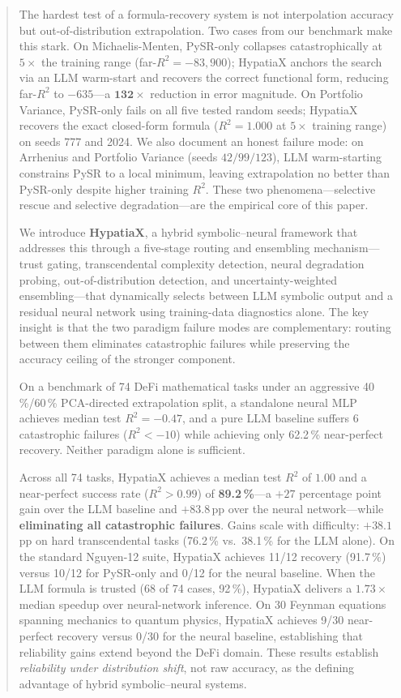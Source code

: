 \documentclass[twoside,11pt]{article}
\newcommand{\Rsq}{R^{2}}
\begin{document}
\begin{abstract}
The hardest test of a formula-recovery system is not interpolation accuracy but
out-of-distribution extrapolation.  Two cases from our benchmark make this stark.
On Michaelis-Menten, PySR-only collapses catastrophically at $5\times$ the
training range (far-$\Rsq = -83{,}900$); HypatiaX anchors the search via an
LLM warm-start and recovers the correct functional form, reducing far-$\Rsq$
to $-635$---a $\mathbf{132\times}$ reduction in error magnitude.  On Portfolio
Variance, PySR-only fails on all five tested random seeds; HypatiaX recovers
the exact closed-form formula ($\Rsq=1.000$ at $5\times$ training range) on
seeds 777 and 2024.  We also document an honest failure mode: on Arrhenius and
Portfolio Variance (seeds $42/99/123$), LLM warm-starting constrains PySR to a
local minimum, leaving extrapolation no better than PySR-only despite higher
training $\Rsq$.  These two phenomena---selective rescue and selective
degradation---are the empirical core of this paper.

We introduce \textbf{HypatiaX}, a hybrid symbolic--neural framework that
addresses this through a five-stage routing and ensembling mechanism---trust
gating, transcendental complexity detection, neural degradation probing,
out-of-distribution detection, and uncertainty-weighted ensembling---that
dynamically selects between LLM symbolic output and a residual neural network
using training-data diagnostics alone.  The key insight is that the two paradigm
failure modes are complementary: routing between them eliminates catastrophic
failures while preserving the accuracy ceiling of the stronger component.

On a benchmark of 74 DeFi mathematical tasks under an aggressive
40\,\%/60\,\% PCA-directed extrapolation split, a standalone neural MLP achieves
median test $\Rsq = -0.47$, and a pure LLM baseline suffers 6 catastrophic
failures ($\Rsq < -10$) while achieving only 62.2\,\% near-perfect recovery.
Neither paradigm alone is sufficient.

Across all 74 tasks, HypatiaX achieves a median test $\Rsq$ of $1.00$ and a
near-perfect success rate ($\Rsq>0.99$) of \textbf{89.2\,\%}---a $+27$
percentage point gain over the LLM baseline and $+83.8$\,pp over the neural
network---while \textbf{eliminating all catastrophic failures}.
Gains scale with difficulty: $+38.1$\,pp on hard transcendental tasks (76.2\,\%
vs.\ 38.1\,\% for the LLM alone).
On the standard Nguyen-12 suite, HypatiaX achieves 11/12 recovery (91.7\,\%)
versus 10/12 for PySR-only and 0/12 for the neural baseline.
When the LLM formula is trusted (68 of 74 cases, 92\,\%), HypatiaX delivers a
$1.73\times$ median speedup over neural-network inference.
On 30 Feynman equations spanning mechanics to quantum physics, HypatiaX
achieves 9/30 near-perfect recovery versus 0/30 for the neural baseline,
establishing that reliability gains extend beyond the DeFi domain.
These results establish \emph{reliability under distribution shift}, not raw
accuracy, as the defining advantage of hybrid symbolic--neural systems.
\end{abstract}
\end{document}
